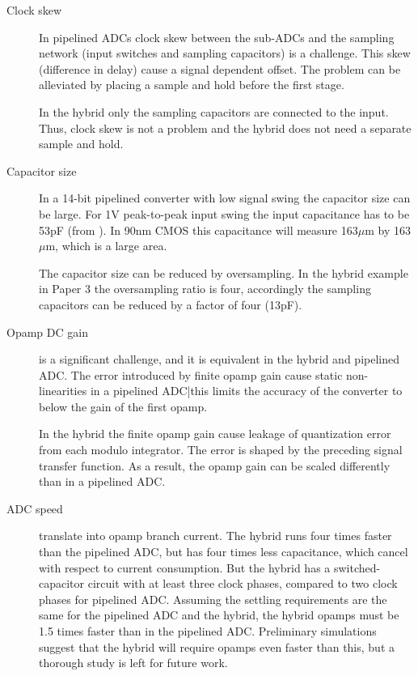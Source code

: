 \begin{description}
\item[Clock skew]  In pipelined ADCs clock skew between  the sub-ADCs and the
  sampling network (input switches and sampling capacitors) is a challenge. This skew (difference in delay) cause a signal dependent
  offset. The problem can be alleviated by placing a sample and hold
  before the first stage.

In the hybrid only the sampling capacitors are connected to the
input. Thus, clock skew is not a problem and the
hybrid does not need a separate sample and hold. 


\item[Capacitor size] In a 14-bit pipelined converter with low signal swing
 the capacitor size can be large. For 1V peak-to-peak input swing the
  input capacitance has to be 53pF (from ). In 90nm CMOS this
  capacitance will measure 163$\mu$m by 163$\mu$m, which is a large
  area. 

The
  capacitor size can be reduced by oversampling.
  In the hybrid example in Paper 3 the oversampling ratio is four, accordingly the
  sampling capacitors can be reduced by a factor of four (13pF). 

\item[Opamp DC gain] is a significant challenge, and it is equivalent in
  the hybrid and pipelined ADC. The
error introduced by finite opamp gain cause static 
non-linearities in a pipelined ADC|this limits the accuracy of the
converter to
below the gain of the first opamp.

 In the hybrid the
finite opamp
gain
cause leakage of quantization error from each modulo integrator. The error is
shaped by the preceding signal transfer function. As a result, the
opamp gain can be scaled differently than in a pipelined ADC. 


\item[ADC speed] translate into opamp branch current. The hybrid runs four
  times faster than the pipelined ADC, but has four times less
  capacitance, which cancel  with respect to current consumption. But the hybrid has a
  switched-capacitor circuit with at least three clock phases, compared to
  two clock phases for pipelined ADC. Assuming the settling requirements are
  the same for the pipelined ADC and the hybrid, the hybrid opamps must be 1.5 times faster than in the
  pipelined ADC. Preliminary simulations suggest that the hybrid will
  require opamps even faster than this, but a thorough study
  is left for future work.
\end{description}


